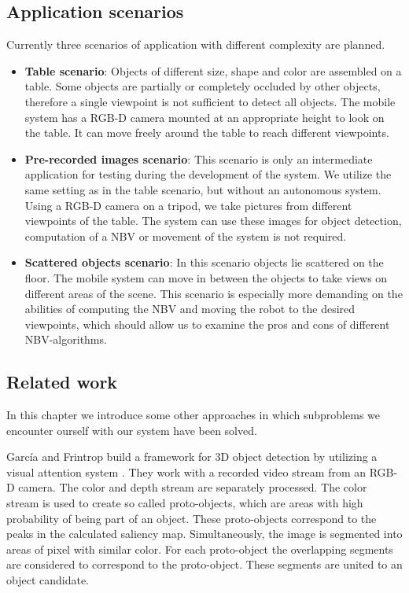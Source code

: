 \documentclass[a4paper,11pt,english]{article}
\begin{document}
\subsection{Application scenarios}
Currently three scenarios of application with different complexity are planned.
\begin{itemize}	
	\item \textbf{Table scenario}: Objects of different size, shape and color are assembled on a table. Some objects are partially or completely occluded by other objects, therefore a single viewpoint is not sufficient to detect all objects. The mobile system has a RGB-D camera mounted at an appropriate height to look on the table. It can move freely around the table to reach different viewpoints.
	\item \textbf{Pre-recorded images scenario}: This scenario is only an intermediate application for testing during the development of the system. We utilize the same setting as in the table scenario, but without an autonomous system. Using a RGB-D camera on a tripod, we take pictures from different viewpoints of the table. The system can use these images for object detection, computation of a NBV or movement of the system is not required.
	\item \textbf{Scattered objects scenario}: In this scenario objects lie scattered on the floor. The mobile system can move in between the objects to take views on different areas of the scene. This scenario is especially more demanding on the abilities of computing the NBV and moving the robot to the desired viewpoints, which should allow us to examine the pros and cons of different NBV-algorithms.
\end{itemize} 

\subsection{Related work}
In this chapter we introduce some other approaches in which subproblems we encounter ourself with our system have been solved.\medskip

García and Frintrop build a framework for 3D object detection by utilizing a visual attention system \cite{garcia2013computational}.
They work with a recorded video stream from an RGB-D camera. The color and depth stream are separately processed. 
The color stream is used to create so called proto-objects, which are areas with high probability of being part of an object. These proto-objects correspond to the peaks in the calculated saliency map. 
Simultaneously, the image is segmented into areas of pixel with similar color. 
For each proto-object the overlapping segments are considered to correspond to the proto-object. These segments are united to an object candidate.
\end{document}

